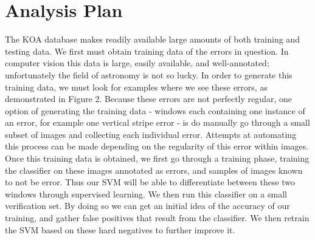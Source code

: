 \documentclass[12pt]{article}
\begin{document}
\newpage
\section*{Analysis Plan}
The KOA database makes readily available large amounts of both training and testing data. We first must obtain training data of the errors in question. In computer vision this data is large, easily available, and well-annotated; unfortunately the field of astronomy is not so lucky. In order to generate this training data, we must look for examples where we see these errors, as demonstrated in Figure 2. Because these errors are not perfectly regular, one option of generating the training data - windows each containing one instance of an error, for example one vertical stripe error - is do manually go through a small subset of images and collecting each individual error. Attempts at automating this process can be made depending on the regularity of this error within images.\\
\indent Once this training data is obtained, we first go through a training phase, training the classifier on these images annotated as errors, and samples of images known to not be error. Thus our SVM will be able to differentiate between these two windows through supervised learning. We then run this classifier on a small verification set. By doing so we can get an initial idea of the accuracy of our training, and gather false positives that result from the classifier. We then retrain the SVM based on these hard negatives to further improve it.\\
\end{document}
